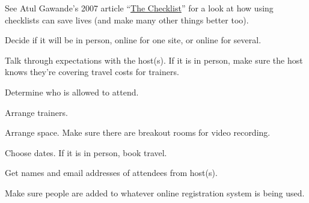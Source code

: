 
See Atul Gawande's 2007 article
``\href{http://www.newyorker.com/magazine/2007/12/10/the-checklist}{The Checklist}''
for a look at how using checklists can save lives (and make many other
things better too).


\begin{genumerate}

\item
  Decide if it will be in person, online for one site, or online for
  several.

\item
  Talk through expectations with the host(s).
  If it is in person, make sure the host knows they're covering
  travel costs for trainers.

\item
  Determine who is allowed to attend.

\item
  Arrange trainers.

\item
  Arrange space.
  Make sure there are breakout rooms for video recording.

\item
  Choose dates.
  If it is in person, book travel.

\item
  Get names and email addresses of attendees from host(s).

\item
  Make sure people are added to whatever online registration system is
  being used.

\end{genumerate}


